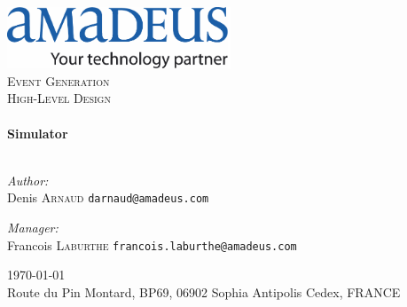 \begin{titlepage}

\begin{center}


\includegraphics[width=0.5\textwidth]{./amadeus_logo}\\[1cm]

\textsc{\LARGE Event Generation}\\[1.5cm]

\textsc{\Large High-Level Design}\\[0.5cm]


\HRule \\[0.4cm]
{ \huge \bfseries Simulator}\\[0.4cm]

\HRule \\[1.5cm]

\begin{minipage}{0.4\textwidth}
\begin{flushleft} \large
\emph{Author:}\\
Denis \textsc{Arnaud} \texttt{darnaud@amadeus.com}
\end{flushleft}
\end{minipage}
\begin{minipage}{0.4\textwidth}
\begin{flushright} \large
\emph{Manager:} \\
Francois \textsc{Laburthe} \texttt{francois.laburthe@amadeus.com}
\end{flushright}
\end{minipage}

\vfill

{\large \today \\
  Route du Pin Montard, BP69, 06902 Sophia Antipolis Cedex, FRANCE}

\end{center}

\end{titlepage}
